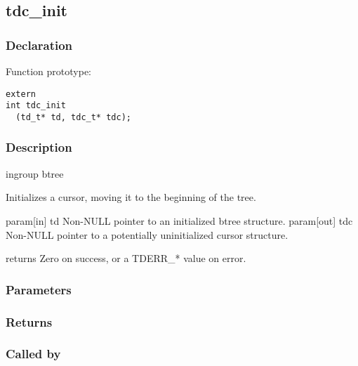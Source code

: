 
\newpage
\subsection{tdc\_init}
\subsubsection{Declaration} Function prototype:

\begin{verbatim}
extern
int tdc_init
  (td_t* td, tdc_t* tdc);
\end{verbatim}

\subsubsection{Description}


 ingroup btree

 Initializes a cursor, moving it to the beginning of the tree.

 param[in] td Non-NULL pointer to an initialized btree structure.
 param[out] tdc Non-NULL pointer to a potentially uninitialized cursor
 structure.

 returns Zero on success, or a TDERR\_* value on error.
 

\subsubsection{Parameters}
\subsubsection{Returns}
\subsubsection{Called by}
